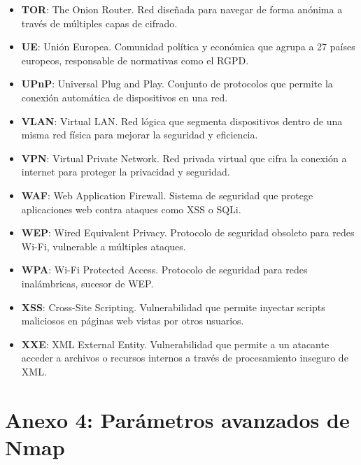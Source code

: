 \documentclass[a4paper, 11pt]{article}
\begin{document}
\begin{itemize}
    \item \textbf{TOR}: The Onion Router. Red diseñada para navegar de forma anónima a través de múltiples capas de cifrado.

    \item \textbf{UE}: Unión Europea. Comunidad política y económica que agrupa a 27 países europeos, responsable de normativas como el RGPD.

    \item \textbf{UPnP}: Universal Plug and Play. Conjunto de protocolos que permite la conexión automática de dispositivos en una red.

    \item \textbf{VLAN}: Virtual LAN. Red lógica que segmenta dispositivos dentro de una misma red física para mejorar la seguridad y eficiencia.

    \item \textbf{VPN}: Virtual Private Network. Red privada virtual que cifra la conexión a internet para proteger la privacidad y seguridad.

    \item \textbf{WAF}: Web Application Firewall. Sistema de seguridad que protege aplicaciones web contra ataques como XSS o SQLi.

    \item \textbf{WEP}: Wired Equivalent Privacy. Protocolo de seguridad obsoleto para redes Wi-Fi, vulnerable a múltiples ataques.

    \item \textbf{WPA}: Wi-Fi Protected Access. Protocolo de seguridad para redes inalámbricas, sucesor de WEP.

    \item \textbf{XSS}: Cross-Site Scripting. Vulnerabilidad que permite inyectar scripts maliciosos en páginas web vistas por otros usuarios.

    \item \textbf{XXE}: XML External Entity. Vulnerabilidad que permite a un atacante acceder a archivos o recursos internos a través de procesamiento inseguro de XML.
\end{itemize}

\clearpage
\thispagestyle{nohead}

\section*{Anexo 4: Parámetros avanzados de Nmap}
\label{anexo:4}
\end{document}
